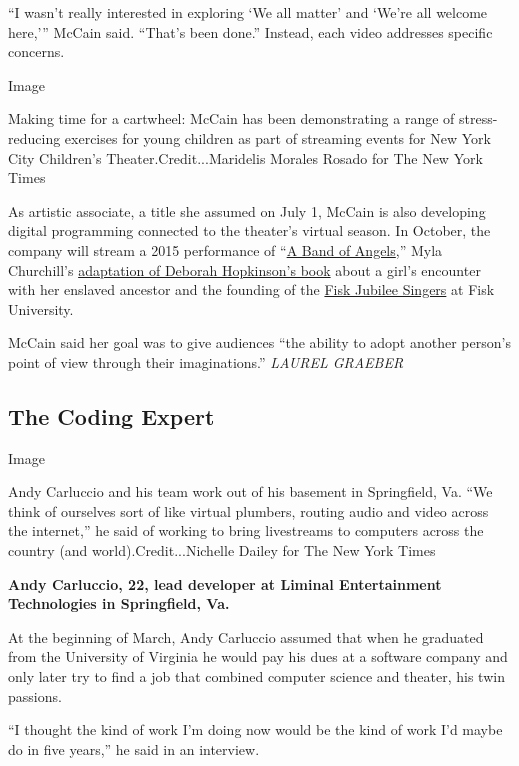 ``I wasn't really interested in exploring `We all matter' and `We're all
welcome here,''' McCain said. ``That's been done.'' Instead, each video
addresses specific concerns.

Image

Making time for a cartwheel: McCain has been demonstrating a range of
stress-reducing exercises for young children as part of streaming events
for New York City Children's Theater.Credit...Maridelis Morales Rosado
for The New York Times

As artistic associate, a title she assumed on July 1, McCain is also
developing digital programming connected to the theater's virtual
season. In October, the company will stream a 2015 performance of
``\href{https://nycchildrenstheater.org/shows-and-programs/band-angels-2005/}{A
Band of Angels},'' Myla Churchill's
\href{https://www.nytimes3xbfgragh.onion/2005/02/04/arts/fighting-a-war-on-two-fronts.html}{adaptation
of Deborah Hopkinson's book} about a girl's encounter with her enslaved
ancestor and the founding of the
\href{http://fiskjubileesingers.org/}{Fisk Jubilee Singers} at Fisk
University.

McCain said her goal was to give audiences ``the ability to adopt
another person's point of view through their imaginations.''
\emph{LAUREL GRAEBER}

\hypertarget{the-coding-expert}{%
\subsection{The Coding Expert}\label{the-coding-expert}}

Image

Andy Carluccio and his team work out of his basement in Springfield, Va.
``We think of ourselves sort of like virtual plumbers, routing audio and
video across the internet,'' he said of working to bring livestreams to
computers across the country (and world).Credit...Nichelle Dailey for
The New York Times

\textbf{Andy Carluccio, 22, lead developer at Liminal Entertainment
Technologies in Springfield, Va.}

At the beginning of March, Andy Carluccio assumed that when he graduated
from the University of Virginia he would pay his dues at a software
company and only later try to find a job that combined computer science
and theater, his twin passions.

``I thought the kind of work I'm doing now would be the kind of work I'd
maybe do in five years,'' he said in an interview.

